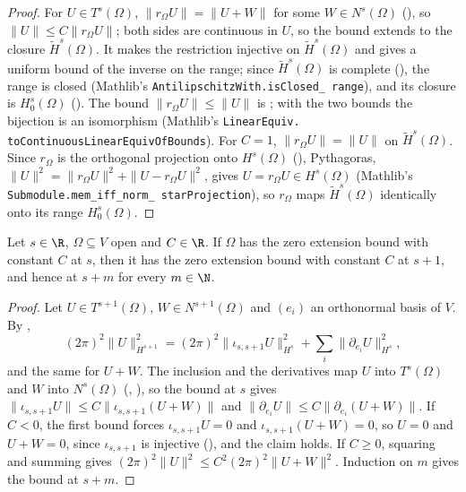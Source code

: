 \begin{proof}
\leanok
For $U \in T^s(\Omega)$, $\|r_\Omega U\| = \|U + W\|$ for some $W \in N^s(\Omega)$
(), so $\|U\| \leq C \|r_\Omega U\|$; both sides are
continuous in $U$, so the bound extends to the closure $\tilde H^s(\Omega)$. It makes the
restriction injective on $\tilde H^s(\Omega)$ and gives a uniform bound of the inverse on the
range; since $\tilde H^s(\Omega)$ is complete (),
the range is closed (Mathlib's \texttt{AntilipschitzWith.\allowbreak isClosed\_\allowbreak
range}), and its closure is $H^s_0(\Omega)$ (). The
bound $\|r_\Omega U\| \leq \|U\|$ is ; with the two bounds
the bijection is an isomorphism (Mathlib's \texttt{LinearEquiv.\allowbreak
toContinuousLinearEquivOfBounds}). For $C = 1$, $\|r_\Omega U\| = \|U\|$ on
$\tilde H^s(\Omega)$. Since $r_\Omega$ is the orthogonal projection onto $H^s(\Omega)$
(), Pythagoras,
$\|U\|^2 = \|r_\Omega U\|^2 + \|U - r_\Omega U\|^2$, gives $U = r_\Omega U \in H^s(\Omega)$
(Mathlib's \texttt{Submodule.\allowbreak mem\_\allowbreak iff\_\allowbreak norm\_\allowbreak
starProjection}), so $r_\Omega$ maps $\tilde H^s(\Omega)$ identically onto its range
$H^s_0(\Omega)$.
\end{proof}

\begin{theorem}
\label{thm:zero-extension-bound-lift}
\leanok
{}
Let $s \in \R$, $\Omega \subseteq V$ open and $C \in \R$. If $\Omega$ has the zero extension
bound with constant $C$ at $s$, then it has the zero extension bound with constant $C$ at $s + 1$,
and hence at $s + m$ for every $m \in \N$.
\end{theorem}

\begin{proof}
\leanok
Let $U \in T^{s+1}(\Omega)$, $W \in N^{s+1}(\Omega)$ and $(e_i)$ an orthonormal basis of $V$. By
,
\[
  (2\pi)^2 \|U\|_{H^{s+1}}^2 = (2\pi)^2 \|\iota_{s,s+1} U\|_{H^s}^2
  + \sum_i \|\partial_{e_i} U\|_{H^s}^2 ,
\]
and the same for $U + W$. The inclusion and the derivatives map $U$ into $T^s(\Omega)$ and $W$
into $N^s(\Omega)$ (, ), so the
bound at $s$ gives $\|\iota_{s,s+1} U\| \leq C \|\iota_{s,s+1}(U + W)\|$ and
$\|\partial_{e_i} U\| \leq C \|\partial_{e_i}(U + W)\|$. If $C < 0$, the first bound forces
$\iota_{s,s+1} U = 0$ and $\iota_{s,s+1}(U + W) = 0$, so $U = 0$ and $U + W = 0$, since
$\iota_{s,s+1}$ is injective (), and the claim holds. If $C \geq 0$,
squaring and summing gives $(2\pi)^2 \|U\|^2 \leq C^2 (2\pi)^2 \|U + W\|^2$. Induction on $m$
gives the bound at $s + m$.
\end{proof}

